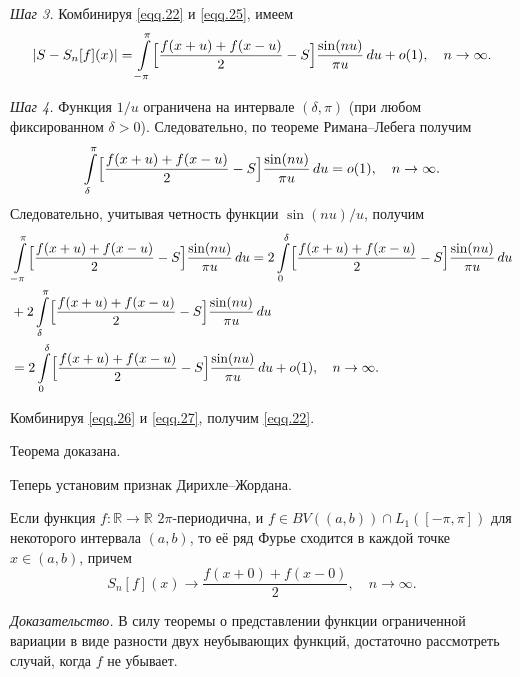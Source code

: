 \textit{Шаг 3.} Комбинируя \eqref{eqq.22} и \eqref{eqq.25}, имеем
\begin{equation}
	\label{eqq.26}
	|S-S_{n}[f](x)| = \int\limits_{-\pi}^{\pi}\Bigl[\frac{f(x+u)+f(x-u)}{2}-S\Bigr]\frac{\sin(nu)}{\pi u}\,du + o(1), \quad n \to \infty.
\end{equation}

\textit{Шаг 4.}  Функция $1/u$ ограничена на интервале $(\delta,\pi)$ (при любом фиксированном $\delta > 0$). Следовательно, по теореме Римана--Лебега получим
\begin{equation}
	\notag
	\int\limits_{\delta}^{\pi}\Bigl[\frac{f(x+u)+f(x-u)}{2}-S\Bigr]\frac{\sin(nu)}{\pi u}\,du = o(1), \quad n \to \infty.
\end{equation}
Следовательно, учитывая четность функции $\sin(nu)/u$, получим
\begin{equation}
	\label{eqq.27}
	\begin{split}
		&\int\limits_{-\pi}^{\pi}\Bigl[\frac{f(x+u)+f(x-u)}{2}-S\Bigr]\frac{\sin(nu)}{\pi u}\,du = 2\int\limits_{0}^{\delta}\Bigl[\frac{f(x+u)+f(x-u)}{2}-S\Bigr]\frac{\sin(nu)}{\pi u}\,du\\ 
		& + 2\int\limits_{\delta}^{\pi}\Bigl[\frac{f(x+u)+f(x-u)}{2}-S\Bigr]\frac{\sin(nu)}{\pi u}\,du\\ 
		&= 2\int\limits_{0}^{\delta}\Bigl[\frac{f(x+u)+f(x-u)}{2}-S\Bigr]\frac{\sin(nu)}{\pi u}\,du + o(1), \quad n \to \infty.
	\end{split}
\end{equation}

Комбинируя \eqref{eqq.26} и \eqref{eqq.27}, получим \eqref{eqq.22}.

Теорема доказана.

Теперь установим признак Дирихле--Жордана.

\begin{theorem}
	Если функция $f:\mathbb{R} \to \mathbb{R}$ $2\pi$-периодична, и $f \in BV((a,b)) \cap L_{1}([-\pi,\pi])$ для некоторого интервала $(a,b)$, то её ряд Фурье сходится в каждой точке $x \in (a,b)$, причем
	$$
	S_{n}[f](x) \to \frac{f(x+0)+f(x-0)}{2}, \quad n \to \infty.
	$$
\end{theorem}

\textit{Доказательство.}
В силу теоремы о представлении функции ограниченной вариации в виде разности двух неубывающих функций, достаточно рассмотреть случай, когда $f$ не убывает.

